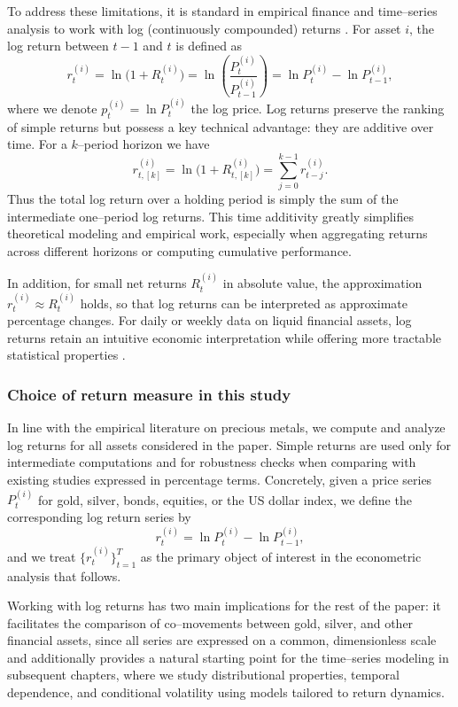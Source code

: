 To address these limitations, it is standard in empirical finance and time–series analysis
to work with log (continuously compounded) returns . For asset $i$, the log
return between $t-1$ and $t$ is defined as
\[
r^{(i)}_t = \ln \bigl(1 + R^{(i)}_t\bigr)
= \ln \left( \frac{P^{(i)}_t}{P^{(i)}_{t-1}} \right)
= \ln P^{(i)}_t - \ln P^{(i)}_{t-1},
\]
where we denote $p^{(i)}_t = \ln P^{(i)}_t$ the log price. Log returns preserve the ranking
of simple returns but possess a key technical advantage: they are additive over time. For a
$k$–period horizon we have
\[
r^{(i)}_{t,[k]}
= \ln \bigl(1 + R^{(i)}_{t,[k]}\bigr)
= \sum_{j=0}^{k-1} r^{(i)}_{t-j}.
\]
Thus the total log return over a holding period is simply the sum of the intermediate
one–period log returns. This time additivity greatly simplifies theoretical modeling and
empirical work, especially when aggregating returns across different horizons or computing
cumulative performance.

In addition, for small net returns $R^{(i)}_t$ in absolute value, the approximation
$r^{(i)}_t \approx R^{(i)}_t$ holds, so that log returns can be interpreted as approximate
percentage changes. For daily or weekly data on liquid financial assets, log returns retain
an intuitive economic interpretation while offering more tractable statistical properties
.
\subsubsection{Choice of return measure in this study}

In line with the empirical literature on precious metals, we compute and analyze log
returns for all assets considered in the paper. Simple returns are used only for
intermediate computations and for robustness checks when comparing with existing studies
expressed in percentage terms. Concretely, given a price series $P^{(i)}_t$ for gold,
silver, bonds, equities, or the US dollar index, we define the corresponding log return
series by
\[
r^{(i)}_t = \ln P^{(i)}_t - \ln P^{(i)}_{t-1},
\]
and we treat $\{ r^{(i)}_t \}_{t=1}^T$ as the primary object of interest in the econometric
analysis that follows.

Working with log returns has two main implications for the rest of the paper: it facilitates the comparison of co–movements between gold, silver, and other financial
assets, since all series are expressed on a common, dimensionless scale and additionally provides a natural starting point for the time–series modeling in subsequent chapters, where we study distributional properties, temporal dependence, and conditional volatility
using models tailored to return dynamics.
